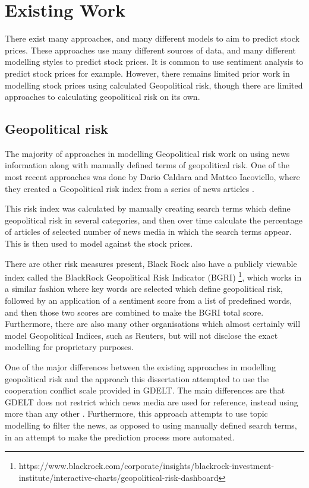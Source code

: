 \section{Existing Work}

There exist many approaches, and many different models to aim to predict stock prices. These approaches use many different sources of data, and many different modelling styles to predict stock prices. It is common to use sentiment analysis to predict stock prices for example. However, there remains limited prior work in modelling stock prices using calculated Geopolitical risk, though there are limited approaches to calculating geopolitical risk on its own.

\subsection{Geopolitical risk}
The majority of approaches in modelling Geopolitical risk work on using news information along with manually defined terms of geopolitical risk. One of the most recent approaches was done by Dario Caldara and Matteo Iacoviello, where they created a Geopolitical risk index from a series of news articles \cite{caldara2018measuring}. 

This risk index was calculated by manually creating search terms which define geopolitical risk in several categories, and then over time calculate the percentage of articles of selected number of news media in which the search terms appear. This is then used to model against the stock prices.

There are other risk measures present, Black Rock also have a publicly viewable index called the BlackRock Geopolitical Risk Indicator (BGRI) \footnote{https://www.blackrock.com/corporate/insights/blackrock-investment-institute/interactive-charts/geopolitical-risk-dashboard}, which works in a similar fashion where key words are selected which define geopolitical risk, followed by an application of a sentiment score from a list of predefined words, and then those two scores are combined to make the BGRI total score. Furthermore, there are also many other organisations which almost certainly will model Geopolitical Indices, such as Reuters, but will not disclose the exact modelling for proprietary purposes.

One of the major differences between the existing approaches in modelling geopolitical risk and the approach this dissertation attempted to use the cooperation conflict scale provided in GDELT. The main differences are that GDELT does not restrict which news media are used for reference, instead using more than any other . Furthermore, this approach attempts to use topic modelling to filter the news, as opposed to using manually defined search terms, in an attempt to make the prediction process more automated. 

